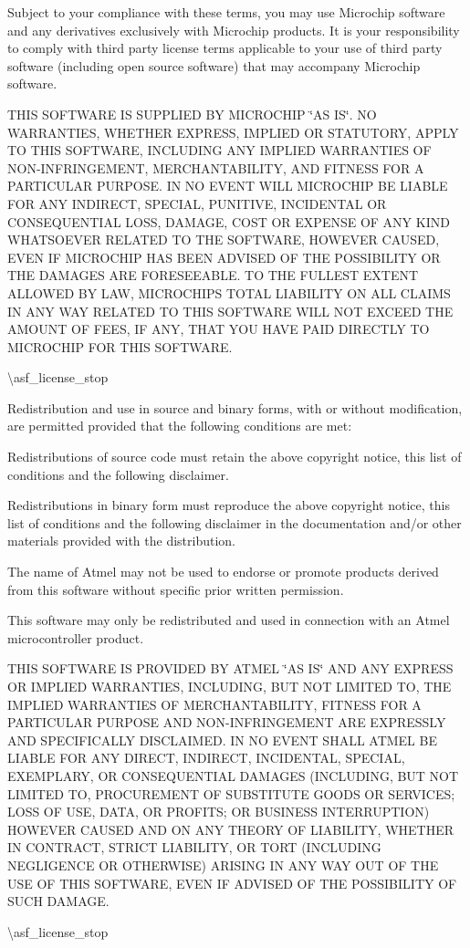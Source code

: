 Subject to your compliance with these terms, you may use Microchip software and any derivatives exclusively with Microchip products. It is your responsibility to comply with third party license terms applicable to your use of third party software (including open source software) that may accompany Microchip software.

THIS SOFTWARE IS SUPPLIED BY MICROCHIP \char`\"{}\+AS IS\char`\"{}. NO WARRANTIES, WHETHER EXPRESS, IMPLIED OR STATUTORY, APPLY TO THIS SOFTWARE, INCLUDING ANY IMPLIED WARRANTIES OF NON-\/\+INFRINGEMENT, MERCHANTABILITY, AND FITNESS FOR A PARTICULAR PURPOSE. IN NO EVENT WILL MICROCHIP BE LIABLE FOR ANY INDIRECT, SPECIAL, PUNITIVE, INCIDENTAL OR CONSEQUENTIAL LOSS, DAMAGE, COST OR EXPENSE OF ANY KIND WHATSOEVER RELATED TO THE SOFTWARE, HOWEVER CAUSED, EVEN IF MICROCHIP HAS BEEN ADVISED OF THE POSSIBILITY OR THE DAMAGES ARE FORESEEABLE. TO THE FULLEST EXTENT ALLOWED BY LAW, MICROCHIP\textquotesingle{}S TOTAL LIABILITY ON ALL CLAIMS IN ANY WAY RELATED TO THIS SOFTWARE WILL NOT EXCEED THE AMOUNT OF FEES, IF ANY, THAT YOU HAVE PAID DIRECTLY TO MICROCHIP FOR THIS SOFTWARE.

\textbackslash{}asf\+\_\+license\+\_\+stop

Redistribution and use in source and binary forms, with or without modification, are permitted provided that the following conditions are met\+:


\begin{DoxyEnumerate}
\item Redistributions of source code must retain the above copyright notice, this list of conditions and the following disclaimer.
\item Redistributions in binary form must reproduce the above copyright notice, this list of conditions and the following disclaimer in the documentation and/or other materials provided with the distribution.
\item The name of Atmel may not be used to endorse or promote products derived from this software without specific prior written permission.
\item This software may only be redistributed and used in connection with an Atmel microcontroller product.
\end{DoxyEnumerate}

THIS SOFTWARE IS PROVIDED BY ATMEL \char`\"{}\+AS IS\char`\"{} AND ANY EXPRESS OR IMPLIED WARRANTIES, INCLUDING, BUT NOT LIMITED TO, THE IMPLIED WARRANTIES OF MERCHANTABILITY, FITNESS FOR A PARTICULAR PURPOSE AND NON-\/\+INFRINGEMENT ARE EXPRESSLY AND SPECIFICALLY DISCLAIMED. IN NO EVENT SHALL ATMEL BE LIABLE FOR ANY DIRECT, INDIRECT, INCIDENTAL, SPECIAL, EXEMPLARY, OR CONSEQUENTIAL DAMAGES (INCLUDING, BUT NOT LIMITED TO, PROCUREMENT OF SUBSTITUTE GOODS OR SERVICES; LOSS OF USE, DATA, OR PROFITS; OR BUSINESS INTERRUPTION) HOWEVER CAUSED AND ON ANY THEORY OF LIABILITY, WHETHER IN CONTRACT, STRICT LIABILITY, OR TORT (INCLUDING NEGLIGENCE OR OTHERWISE) ARISING IN ANY WAY OUT OF THE USE OF THIS SOFTWARE, EVEN IF ADVISED OF THE POSSIBILITY OF SUCH DAMAGE.

\textbackslash{}asf\+\_\+license\+\_\+stop 